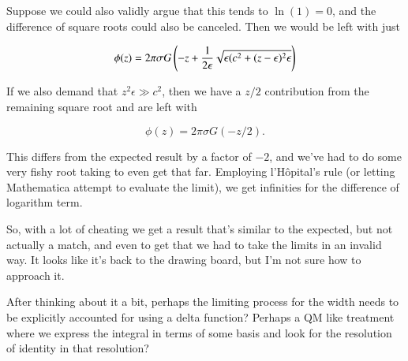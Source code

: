Suppose we could also validly argue that this tends to $\ln(1) = 0$, and the difference of square roots could also be canceled.  Then we would be left with just

\begin{equation}\label{eqn:infiniteSheetPotentials:550}
\phi(z) = 2 \pi \sigma G \left(-z + \frac{1}{2\epsilon} \sqrt{\epsilon(c^2 + (z - \epsilon)^2\epsilon} \right)
\end{equation}

If we also demand that $z^2 \epsilon \gg c^2$, then we have a $z/2$ contribution from the remaining square root and are left with

\begin{equation}\label{eqn:infiniteSheetPotentials:570}
\phi(z) = 2 \pi \sigma G (-z/2).
\end{equation}

This differs from the expected result by a factor of $-2$, and we've had to do some very fishy root taking to even get that far.  Employing l'H\^opital's rule (or letting Mathematica attempt to evaluate the limit), we get infinities for the difference of logarithm term.

So, with a lot of cheating we get a result that's similar to the expected, but not actually a match, and even to get that we had to take the limits in an invalid way.  It looks like it's back to the drawing board, but I'm not sure how to approach it.

After thinking about it a bit, perhaps the limiting process for the width needs to be explicitly accounted for using a delta function?  Perhaps a QM like treatment where we express the integral in terms of some basis and look for the resolution of identity in that resolution?


\EndNoBibArticle
